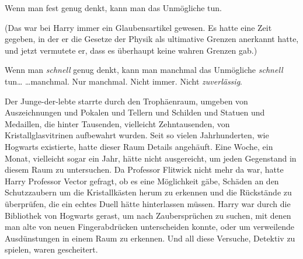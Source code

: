 \later

Wenn man fest genug denkt, kann man das Unmögliche tun.

(Das war bei Harry immer ein Glaubensartikel gewesen. Es hatte eine Zeit gegeben, in der er die Gesetze der Physik als ultimative Grenzen anerkannt hatte, und jetzt vermutete er, dass es überhaupt keine wahren Grenzen gab.)




Wenn man \emph{schnell} genug denkt, kann man manchmal das Unmögliche \emph{schnell} tun…
…manchmal. Nur manchmal. Nicht immer. Nicht \emph{zuverlässig}.

Der Junge-der-lebte starrte durch den Trophäenraum, umgeben von Auszeichnungen und Pokalen und Tellern und Schilden und Statuen und Medaillen, die hinter Tausenden, vielleicht Zehntausenden, von Kristallglasvitrinen aufbewahrt wurden. Seit so vielen Jahrhunderten, wie Hogwarts existierte, hatte dieser Raum Details angehäuft. Eine Woche, ein Monat, vielleicht sogar ein Jahr, hätte nicht ausgereicht, um jeden Gegenstand in diesem Raum zu untersuchen. Da Professor Flitwick nicht mehr da war, hatte Harry Professor Vector gefragt, ob es eine Möglichkeit gäbe, Schäden an den Schutzzaubern um die Kristallkästen herum zu erkennen und die Rückstände zu überprüfen, die ein echtes Duell hätte hinterlassen müssen.
Harry war durch die Bibliothek von Hogwarts gerast, um nach Zaubersprüchen zu suchen, mit denen man alte von neuen Fingerabdrücken unterscheiden konnte, oder um verweilende Ausdünstungen in einem Raum zu erkennen. Und all diese Versuche, Detektiv zu spielen, waren gescheitert.

